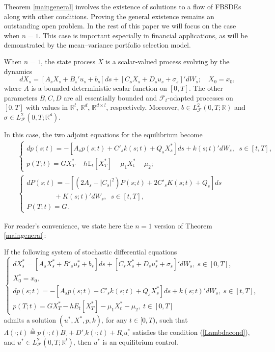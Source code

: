 \documentclass[final]{siamltex}
\begin{document}
Theorem \ref{maingeneral} involves the existence of solutions to a flow of FBSDEs along with other conditions.
Proving the general existence remains an outstanding open problem. In the rest of this paper we will focus on the case when $n=1$. This case is important especially in
financial applications, as will be demonstrated by the mean--variance portfolio selection model.

When $n=1$, the state process $X$ is a  scalar-valued process evolving by the dynamics
\begin{equation}\label{control}
dX_s=[A_sX_s+B_s'u_s+b_s]ds+ [C_sX_s+D_s u_s+\sigma_s]'dW_s;\quad X_0=x_0,
\end{equation}
where $A$ is a bounded deterministic  scalar function on $[0, T]$.
The other parameters $B,C,D$ are all essentially bounded  and ${{\mathcal F}}_t$-adapted processes on $[0,T]$
with values in ${\mathbb{R}}^{ l}$,
${\mathbb{R}}^d$, ${\mathbb{R}}^{ d\times l}$,  respectively. Moreover,  $b\in L^2_{{\mathcal F}}(0,T; {\mathbb{R}})$ and $\sigma\in L^2_{{\mathcal F}}(0,T; {\mathbb{R}}^d)$.

In this case,  the two adjoint equations for the equilibrium become
\begin{eqnarray}
&&\left\{\begin{array}{l}
dp(s;t)=-[A_sp(s;t)+C'_s k(s;t)+Q_sX^*_s]ds+k(s;t)'dW_s,\;\;s\in[t,T],\\
p(T;t)=G X^*_T- h \mathbb E_t[X^*_T]-\mu_1 X_t^*-\mu_2;
\end{array}\right.  \label{adjoint1} \\
&&\left\{\begin{array}{l}
dP(s;t)=-[(2A_s+|C_s|^2) P(s;t)+2C'_sK(s;t)+Q_s]ds\\
\quad\quad\quad\quad+K(s;t)'dW_s,\;\;s\in[t,T],\\
P(T;t)=G.
\end{array}\right. \label{adjoint2}
\end{eqnarray}

For reader's convenience,  we state here the $n=1$ version of Theorem \ref{maingeneral}:
\begin{theorem}\label{main}
If the following system of  stochastic differential equations
\begin{equation}\label{fbsde}
\left\{
\begin{array}{l}
dX^*_s=[A_sX^*_s+B'_su^*_s+b_s]ds+ [C_sX_s^*+D_su^*_s+\sigma_s]'dW_s,\;s\in[0,T],\\
X_0^*=x_0,\\
dp(s;t)=-[A_sp(s;t)+C'_sk(s;t)+Q_sX^*_s]ds+k(s;t)'dW_s,\;s\in [t,T],\\
p(T;t)=G X^*_T-h E_t[X^*_T]-\mu_1 X_t^*-\mu_2,\;t\in[0,T]
\end{array}\right.
\end{equation}
admits a solution $(u^*, X^*,p,k)$, for any $t\in [0, T)$, such that $\Lambda(\cdot; t){\stackrel{\triangle}{=}} p(\cdot;t)B_{\cdot}+D'_{\cdot}k(\cdot;t)+R_{\cdot} u^*_{\cdot}$ satisfies the condition (\ref{Lambdacond}),
and  $u^*\in L^2_{{\mathcal F}}(0,T;{\mathbb{R}}^l)$,
then $u^*$ is an equilibrium control.
\end{theorem}
\end{document}
